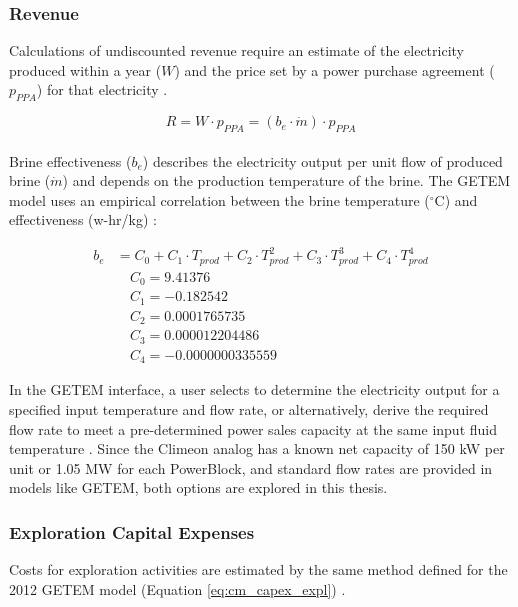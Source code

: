 \subsubsection{Revenue} 
\label{ch4:cm_rev}

Calculations of undiscounted revenue require an estimate of the electricity produced within a year ($W$) and the price set by a power purchase agreement ($p_{PPA}$) for that electricity \citep{entingh_volume_2006}. 

\begin{equation}
    \label{eq:cm_rev}
    R = W \cdot p_{PPA} = (b_e \cdot \dot{m}) \cdot p_{PPA}
\end{equation}
\\
Brine effectiveness ($b_e$) describes the electricity output per unit flow of produced brine ($\dot{m}$) and depends on the production temperature of the brine. The GETEM model uses an empirical correlation between the brine temperature ($^\circ$C) and effectiveness (w-hr/kg) \citep[p.\ 62]{entingh_volume_2006}:

\begin{equation}
\begin{aligned}
    \label{eq:brine_eff}
    b_e &= C_0 + C_1 \cdot T_{prod} + C_2 \cdot T_{prod}^2 + C_3 \cdot T_{prod}^3 + C_4 \cdot T_{prod}^4 \\
    &\quad C_0 = 9.41376 \\
    &\quad C_1 = -0.182542 \\
    &\quad C_2 = 0.0001765735 \\
    &\quad C_3 = 0.000012204486 \\
    &\quad C_4 = -0.0000000335559
\end{aligned}
\end{equation}

In the GETEM interface, a user selects to determine the electricity output for a specified input temperature and flow rate, or alternatively, derive the required flow rate to meet a pre-determined power sales capacity at the same input fluid temperature \citep{entingh_volume_2006}. Since the Climeon analog has a known net capacity of 150 kW per unit or 1.05 MW for each PowerBlock, and standard flow rates are provided in models like GETEM, both options are explored in this thesis.

\subsubsection{Exploration Capital Expenses} 
\label{ch4:cm_capex_expl}
Costs for exploration activities are estimated by the same method defined for the 2012 GETEM model (Equation \ref{eq:cm_capex_expl}) \citep{eere_getem_2012}. 

